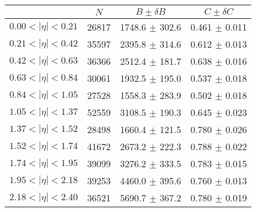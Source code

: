 \begin{tabular}{lccc}
\hline
    &   $N$   & $B \pm \delta B$  &  $C \pm \delta C$ \\
\hline
$0.00 < |\eta| <0.21$          & 26817      & 1748.6     $\pm$ 302.6 & 0.461      $\pm$ 0.011 \\
$0.21 < |\eta| <0.42$          & 35597      & 2395.8     $\pm$ 314.6 & 0.612      $\pm$ 0.013 \\
$0.42 < |\eta| <0.63$          & 36366      & 2512.4     $\pm$ 181.7 & 0.638      $\pm$ 0.016 \\
$0.63 < |\eta| <0.84$          & 30061      & 1932.5     $\pm$ 195.0 & 0.537      $\pm$ 0.018 \\
$0.84 < |\eta| <1.05$          & 27528      & 1558.3     $\pm$ 283.9 & 0.502      $\pm$ 0.018 \\
$1.05 < |\eta| <1.37$          & 52559      & 3108.5     $\pm$ 190.3 & 0.645      $\pm$ 0.023 \\
$1.37 < |\eta| <1.52$          & 28498      & 1660.4     $\pm$ 121.5 & 0.780      $\pm$ 0.026 \\
$1.52 < |\eta| <1.74$          & 41672      & 2673.2     $\pm$ 222.3 & 0.788      $\pm$ 0.022 \\
$1.74 < |\eta| <1.95$          & 39099      & 3276.2     $\pm$ 333.5 & 0.783      $\pm$ 0.015 \\
$1.95 < |\eta| <2.18$          & 39253      & 4460.0     $\pm$ 395.6 & 0.760      $\pm$ 0.013 \\
$2.18 < |\eta| <2.40$          & 36521      & 5690.7     $\pm$ 367.2 & 0.780      $\pm$ 0.019 \\
\hline
\end{tabular}
